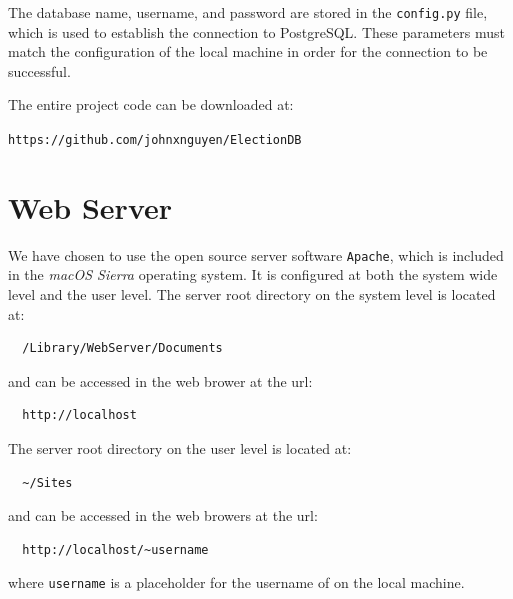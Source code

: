 \documentclass[a4paper, 12pt]{report}
\begin{document}
The database name, username, and password are stored in the \texttt{config.py} file, which is used to establish the connection to PostgreSQL. These parameters must match the configuration of the local machine in order for the connection to be successful.

The entire project code can be downloaded at:

\texttt{https://github.com/johnxnguyen/ElectionDB}

\section{Web Server}
We have chosen to use the open source server software \texttt{Apache}, which is included in the \textit{macOS Sierra} operating system. It is configured at both the system wide level and the user level. The server root directory on the system level is located at:

\begin{verbatim}
  /Library/WebServer/Documents
\end{verbatim}

and can be accessed in the web brower at the url:

\begin{verbatim}
  http://localhost
\end{verbatim}

The server root directory on the user level is located at:

\begin{verbatim}
  ~/Sites
\end{verbatim}

and can be accessed in the web browers at the url:

\begin{verbatim}
  http://localhost/~username
\end{verbatim}

where \texttt{username} is a placeholder for the username of on the local machine.
\end{document}
